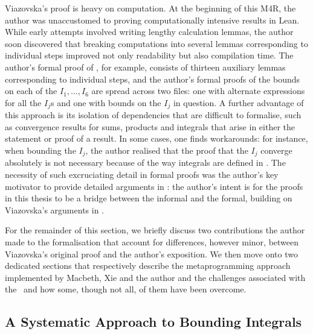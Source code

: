 Viazovska's proof is heavy on computation. At the beginning of this M4R, the author was unaccustomed to proving computationally intensive results in Lean. While early attempts involved writing lengthy calculation lemmas, the author soon discovered that breaking computations into several lemmas corresponding to individual steps improved not only readability but also compilation time. The author's formal proof of , for example, consists of thirteen auxiliary lemmas corresponding to individual steps, and the author's formal proofs of the bounds on each of the $I_1, \ldots, I_6$ are spread across two files: one with alternate expressions for all the $I_j$s and one with bounds on the $I_j$ in question. A further advantage of this approach is its isolation of dependencies that are difficult to formalise, such as convergence results for sums, products and integrals that arise in either the statement or proof of a result. In some cases, one finds workarounds: for instance, when bounding the $I_j$, the author realised that the proof that the $I_j$ converge absolutely is not necessary because of the way integrals are defined in \mathlib. The necessity of such excruciating detail in formal proofs was the author's key motivator to provide detailed arguments in : the author's intent is for the proofs in this thesis to be a bridge between the informal and the formal, building on Viazovska's arguments in \cite[\S 7]{blueprint}.

For the remainder of this section, we briefly discuss two contributions the author made to the formalisation that account for differences, however minor, between Viazovska's original proof and the author's exposition. We then move onto two dedicated sections that respectively describe the metaprogramming approach implemented by Macbeth, Xie and the author and the challenges associated with the \CGT\ and how some, though not all, of them have been overcome.

\subsection{A Systematic Approach to Bounding Integrals}

